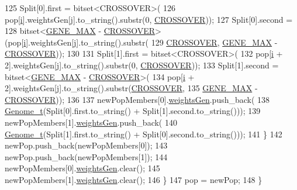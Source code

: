 \begin{DoxyCode}
125       Split[0].first = bitset<CROSSOVER>(
126           pop[\hyperlink{_comparision_pictures_2_createtest_image_8m_a6f6ccfcf58b31cb6412107d9d5281426}{i}].weightsGen[\hyperlink{_comparision_pictures_2_createtest_image_8m_ac86694252f8dfdb19aaeadc4b7c342c6}{j}].to\_string().substr(0, \hyperlink{_soil_math_types_8h_ae84e527452fcf9dfc8ef8fd0dd5cd598}{CROSSOVER}));
127       Split[0].second =
128           bitset<\hyperlink{_soil_math_types_8h_aa5e1eb1a998e5ed69af2076cf318df4b}{GENE\_MAX} - \hyperlink{_soil_math_types_8h_ae84e527452fcf9dfc8ef8fd0dd5cd598}{CROSSOVER}>(pop[\hyperlink{_comparision_pictures_2_createtest_image_8m_a6f6ccfcf58b31cb6412107d9d5281426}{i}].weightsGen[\hyperlink{_comparision_pictures_2_createtest_image_8m_ac86694252f8dfdb19aaeadc4b7c342c6}{j}].to\_string().substr(
129               \hyperlink{_soil_math_types_8h_ae84e527452fcf9dfc8ef8fd0dd5cd598}{CROSSOVER}, \hyperlink{_soil_math_types_8h_aa5e1eb1a998e5ed69af2076cf318df4b}{GENE\_MAX} - \hyperlink{_soil_math_types_8h_ae84e527452fcf9dfc8ef8fd0dd5cd598}{CROSSOVER}));
130 
131       Split[1].first = bitset<CROSSOVER>(
132           pop[\hyperlink{_comparision_pictures_2_createtest_image_8m_a6f6ccfcf58b31cb6412107d9d5281426}{i} + 2].weightsGen[\hyperlink{_comparision_pictures_2_createtest_image_8m_ac86694252f8dfdb19aaeadc4b7c342c6}{j}].to\_string().substr(0, \hyperlink{_soil_math_types_8h_ae84e527452fcf9dfc8ef8fd0dd5cd598}{CROSSOVER}));
133       Split[1].second = bitset<\hyperlink{_soil_math_types_8h_aa5e1eb1a998e5ed69af2076cf318df4b}{GENE\_MAX} - \hyperlink{_soil_math_types_8h_ae84e527452fcf9dfc8ef8fd0dd5cd598}{CROSSOVER}>(
134           pop[\hyperlink{_comparision_pictures_2_createtest_image_8m_a6f6ccfcf58b31cb6412107d9d5281426}{i} + 2].weightsGen[\hyperlink{_comparision_pictures_2_createtest_image_8m_ac86694252f8dfdb19aaeadc4b7c342c6}{j}].to\_string().substr(\hyperlink{_soil_math_types_8h_ae84e527452fcf9dfc8ef8fd0dd5cd598}{CROSSOVER},
135                                                       \hyperlink{_soil_math_types_8h_aa5e1eb1a998e5ed69af2076cf318df4b}{GENE\_MAX} - 
      \hyperlink{_soil_math_types_8h_ae84e527452fcf9dfc8ef8fd0dd5cd598}{CROSSOVER}));
136 
137       newPopMembers[0].\hyperlink{struct_pop_member_struct_a072fadb4863e0cf77b55ad3b46b62522}{weightsGen}.push\_back(
138           \hyperlink{_soil_math_types_8h_a58f6ab36d2cb0527a73caec36d14a0e0}{Genome\_t}(Split[0].first.to\_string() + Split[1].second.to\_string()));
139       newPopMembers[1].\hyperlink{struct_pop_member_struct_a072fadb4863e0cf77b55ad3b46b62522}{weightsGen}.push\_back(
140           \hyperlink{_soil_math_types_8h_a58f6ab36d2cb0527a73caec36d14a0e0}{Genome\_t}(Split[1].first.to\_string() + Split[0].second.to\_string()));
141     \}
142     newPop.push\_back(newPopMembers[0]);
143     newPop.push\_back(newPopMembers[1]);
144     newPopMembers[0].\hyperlink{struct_pop_member_struct_a072fadb4863e0cf77b55ad3b46b62522}{weightsGen}.clear();
145     newPopMembers[1].\hyperlink{struct_pop_member_struct_a072fadb4863e0cf77b55ad3b46b62522}{weightsGen}.clear();
146   \}
147   pop = newPop;
148 \}
\end{DoxyCode}


